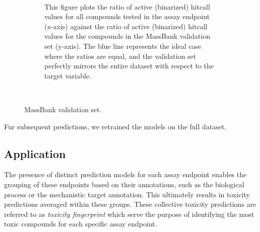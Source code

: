 \begin{enumerate}
\begin{figure}[h]
\begin{subfigure}[b]{0.48\textwidth}
            \caption{This figure plots the ratio of active (binarized) hitcall values for all compounds tested in the assay endpoint (x-axis) against the ratio of active (binarized) hitcall values for the compounds in the MassBank validation set (y-axis). The blue line represents the ideal case where the ratios are equal, and the validation set perfectly mirrors the entire dataset with respect to the target variable.}
            ~\label{fig:activity_ratio_comparison}
        \end{subfigure}
        \caption{MassBank validation set.}
        ~\label{fig:Massbank_validation}
    \end{figure}
\end{enumerate}

Fur subsequent predictions, we retrained the models on the full dataset. 


\subsection{Application}
The presence of distinct prediction models for each assay endpoint enables the grouping of these endpoints based on their annotations, such as the biological process or the mechanistic target annotation. This ultimately results in toxicity predictions averaged within these groups. These collective toxicity predictions are referred to as \emph{toxicity fingerprint} which serve the purpose of identifying the most toxic compounds for each specific assay endpoint.


